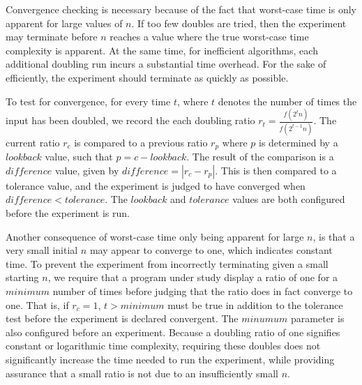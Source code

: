   Convergence checking is necessary because of the fact that worst-case
  time is only apparent for large values of $n$. If too few doubles
  are tried, then the experiment may terminate before $n$ reaches a value
  where the true worst-case time complexity is apparent. At the same time,
  for inefficient  algorithms, each additional doubling run incurs a substantial
  time overhead. For the sake of efficiently, the experiment should
  terminate as quickly as possible.

  To test for convergence, for every time $t$, where $t$ denotes the
  number of times the input has been doubled, we record the each
  doubling ratio $r_t = \frac{f(2^t n)}{f(2^{t-1}n)}$. The current ratio
  $r_c$ is compared to a previous ratio $r_p$ where $p$ is determined by
  a $\mathit{lookback}$ value, such that $p=c-\mathit{lookback}$.  The
  result of the comparison is a $\mathit{difference}$ value, given by
  $\mathit{difference} = |r_c - r_p|$.  This is then compared to a
  tolerance value, and the experiment is judged to have converged when
  $\mathit{difference}<\mathit{tolerance}$.  The $\mathit{lookback}$ and
  $\mathit{tolerance}$ values are both configured before the experiment is
  run.

  Another consequence of worst-case time only being apparent for large
  $n$, is that a very small initial $n$ may appear to converge to one,
  which indicates constant time. To prevent the
  experiment from incorrectly terminating given a small starting $n$, we
  require that a program under study display a ratio of one for a
  $\mathit{minimum}$ number of times before judging that the ratio does in fact converge to one.
  That is, if $r_c = 1$, $t > \mathit{minimum}$ must be true in addition
  to the tolerance test before the experiment is declared convergent.
  The $\mathit{minumum}$ parameter is also configured before an
  experiment.
  Because a doubling ratio of one signifies constant or logarithmic
  time complexity, requiring these doubles does not significantly increase the time needed
  to run the experiment, while providing assurance that a small ratio is not due
  to an insufficiently small $n$.
